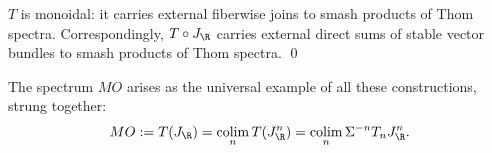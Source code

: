 \begin{lemma}\label{ThomSpacesAreMonoidal}
$T$ is monoidal: it carries external fiberwise joins to smash products of Thom spectra.  Correspondingly, $T \circ J_{\R}$ carries external direct sums of stable vector bundles to smash products of Thom spectra. \qed
\end{lemma}

\begin{definition}\label{DefnOfMO}
The spectrum $MO$ arises as the universal example of all these constructions, strung together:
\[MO := T(J_{\R}) = \colim_n T(J_{\R}^n) = \colim_n \Susp^{-n} T_n J_{\R}^n.\]
\end{definition}

